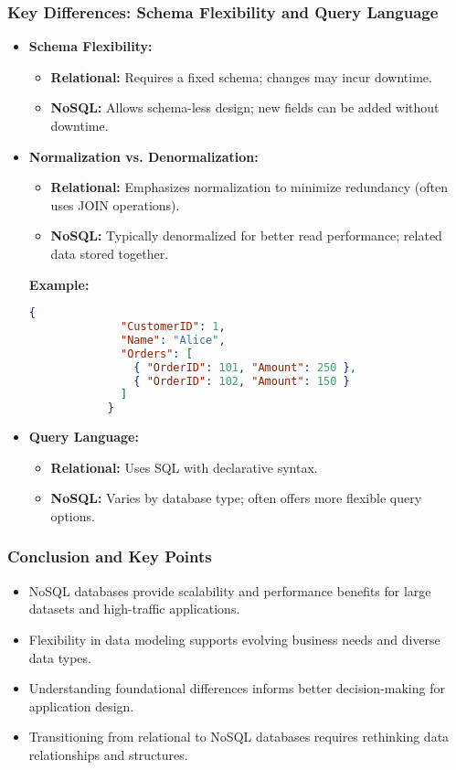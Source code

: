 \documentclass[aspectratio=169]{beamer}
\begin{document}
\begin{frame}
    \frametitle{Key Differences: Schema Flexibility and Query Language}
    \begin{itemize}
        \item \textbf{Schema Flexibility:}
            \begin{itemize}
                \item \textbf{Relational:} Requires a fixed schema; changes may incur downtime.
                \item \textbf{NoSQL:} Allows schema-less design; new fields can be added without downtime.
            \end{itemize}
        \item \textbf{Normalization vs. Denormalization:}
            \begin{itemize}
                \item \textbf{Relational:} Emphasizes normalization to minimize redundancy (often uses JOIN operations).
                \item \textbf{NoSQL:} Typically denormalized for better read performance; related data stored together.
            \end{itemize}
            \textbf{Example:} 
            \begin{lstlisting}[language=json, basicstyle=\footnotesize]
            {
              "CustomerID": 1,
              "Name": "Alice",
              "Orders": [
                { "OrderID": 101, "Amount": 250 },
                { "OrderID": 102, "Amount": 150 }
              ]
            }
            \end{lstlisting}
        \item \textbf{Query Language:}
            \begin{itemize}
                \item \textbf{Relational:} Uses SQL with declarative syntax.
                \item \textbf{NoSQL:} Varies by database type; often offers more flexible query options.
            \end{itemize}
    \end{itemize}
\end{frame}

\begin{frame}
    \frametitle{Conclusion and Key Points}
    \begin{itemize}
        \item NoSQL databases provide scalability and performance benefits for large datasets and high-traffic applications.
        \item Flexibility in data modeling supports evolving business needs and diverse data types.
        \item Understanding foundational differences informs better decision-making for application design.
        \item Transitioning from relational to NoSQL databases requires rethinking data relationships and structures.
    \end{itemize}
\end{frame}
\end{document}

